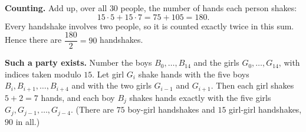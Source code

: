 \textbf{Counting.} Add up, over all $30$ people, the number of hands each person shakes:
\[15\cdot5+15\cdot7=75+105=180.\]
Every handshake involves two people, so it is counted exactly twice in this sum. Hence there are $\dfrac{180}{2}=\boxed{90}$ handshakes.

\textbf{Such a party exists.} Number the boys $B_0,\dots,B_{14}$ and the girls $G_0,\dots,G_{14}$, with indices taken modulo $15$. Let girl $G_i$ shake hands with the five boys $B_i,B_{i+1},\dots,B_{i+4}$ and with the two girls $G_{i-1}$ and $G_{i+1}$. Then each girl shakes $5+2=7$ hands, and each boy $B_j$ shakes hands exactly with the five girls $G_j,G_{j-1},\dots,G_{j-4}$. (There are $75$ boy-girl handshakes and $15$ girl-girl handshakes, $90$ in all.)
